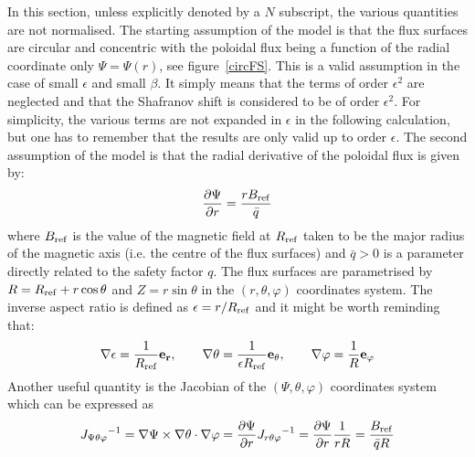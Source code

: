 In this section, unless explicitly denoted by a $N$ subscript, the various quantities are not normalised. The starting assumption of the model is that the flux surfaces are circular and concentric
with the poloidal flux being a function of the radial coordinate only $\Psi=\Psi(r)$, see
figure~\ref{circFS}. This is a valid assumption in the case of small $\epsilon$ and small $\beta$. It simply means that the terms of order $\epsilon^2$ are neglected and that the Shafranov shift is
considered to be of order $\epsilon^2$.
For simplicity, the various terms are not expanded in $\epsilon$ in the following calculation, but one has to remember that the results are only valid up to order $\epsilon$.
The second assumption of the model is that the radial derivative of the poloidal flux is given by:
\begin{equation}
 \frac{\partial \Psi}{\partial r}=\frac{r B_{\mathrm{ref}}}{\bar{q}}
\end{equation}
where $B_{\mathrm{ref}}$ is the value of the magnetic field at $R_{\mathrm{ref}}$ taken to be the major radius of the magnetic axis (i.e. the centre of the flux surfaces) and $\bar{q}>0$ is a parameter directly
related to the safety factor $q$. The flux surfaces are parametrised by $R=R_{\mathrm{ref}}+r \cos \theta$ and $Z=r \sin\theta$ in the $(r,\theta,\varphi)$ coordinates system. The inverse aspect ratio is
defined as $\epsilon=r/R_{\mathrm{ref}}$ and it might be worth reminding that:
\begin{equation}
 \nabla \epsilon = \frac{1}{R_{\mathrm{ref}}} \mathbf{e_r}, \qquad \nabla \theta = \frac{1}{\epsilon R_{\mathrm{ref}}}\mathbf{e_\theta}, \qquad \nabla \varphi = \frac{1}{R} \mathbf{e_\varphi}
\end{equation}
Another useful quantity is the Jacobian of the $(\Psi,\theta,\varphi)$ coordinates system which can be expressed as
\begin{equation}
 {J_{\Psi\theta\varphi}}^{-1}=\nabla\Psi\times\nabla\theta\cdot\nabla\varphi=\frac{\partial \Psi}{\partial r}{J_{r\theta\varphi}}^{-1}=\frac{\partial \Psi}{\partial r}\frac{1}{rR}=\frac{B_{\mathrm{ref}}}{\bar{q}R}
\end{equation}

